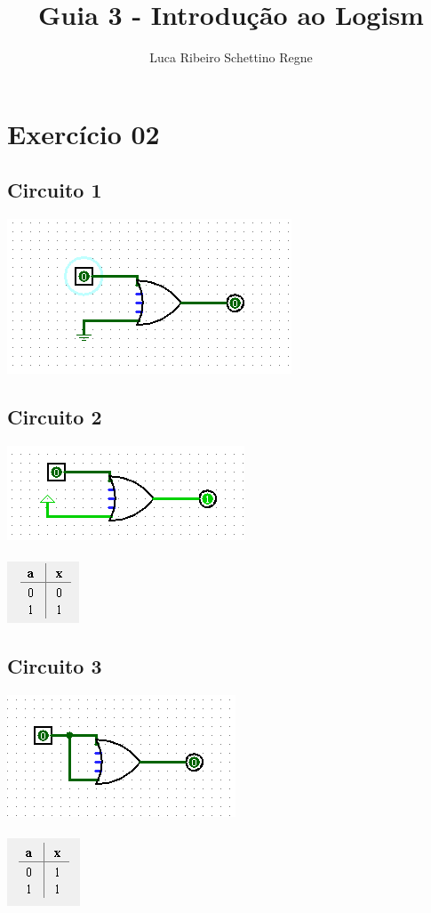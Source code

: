 \documentclass[12pt]{article}
\title{Guia 3 - Introdução ao Logism}
\author{Luca Ribeiro Schettino Regne}
\begin{document}
 

\maketitle

\section{Exercício 02}
\subsection{Circuito 1}
    \includegraphics{./images/circuito01.png}
\subsection{Circuito 2}
    \includegraphics{./images/circuito02.png}\\
    \\\includegraphics{./images/circuito01_table.png}
\subsection{Circuito 3}
    \includegraphics{./images/circuito03.png}\\
    \\\includegraphics{./images/circuito02_table.png}
\end{document}

